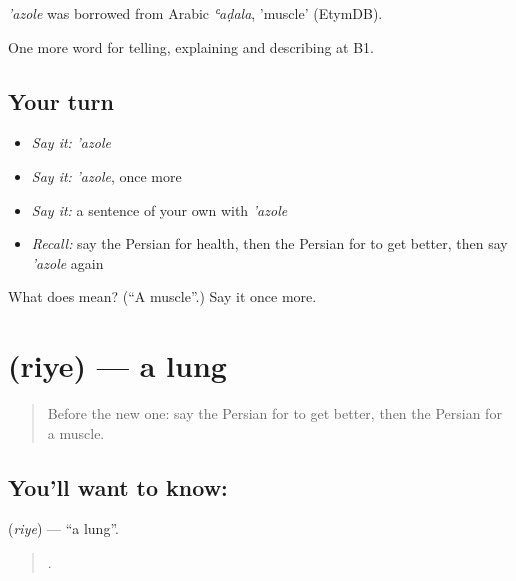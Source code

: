 \begin{cousinweb}
\emph{'azole} was borrowed from Arabic \emph{ʿaḍala}, 'muscle' (EtymDB).
\end{cousinweb}

\begin{grammarlens}[title={What you've built}]
One more word for telling, explaining and describing at B1.
\end{grammarlens}

\subsection*{Your turn}
\begin{itemize}
\raggedright
  \item \emph{Say it:} \emph{'azole}
  \item \emph{Say it:} \emph{'azole}, once more
  \item \emph{Say it:} a sentence of your own with \emph{'azole}
  \item \emph{Recall:} say the Persian for health, then the Persian for to get better, then say \emph{'azole} again
\end{itemize}

\begin{tcolorbox}[breakable,colback=teal!4,colframe=teal!35!black,title={Before you move on}]
What does  mean? (\textquotedblleft{}A muscle\textquotedblright{}.) Say it once more.
\end{tcolorbox}
\section[\texorpdfstring{\fa{ریه} (riye)}{ریه (riye)}]{ (riye) — a lung}

\label{lesson:FA-C495-riye}



\begin{quote}
Before the new one: say the Persian for to get better, then the Persian for a muscle.
\end{quote}

\subsection*{You'll want to know: }
\textbf{} (\emph{riye}) — \textquotedblleft{}a lung\textquotedblright{}.

\begin{quote}
    .
\end{quote}

